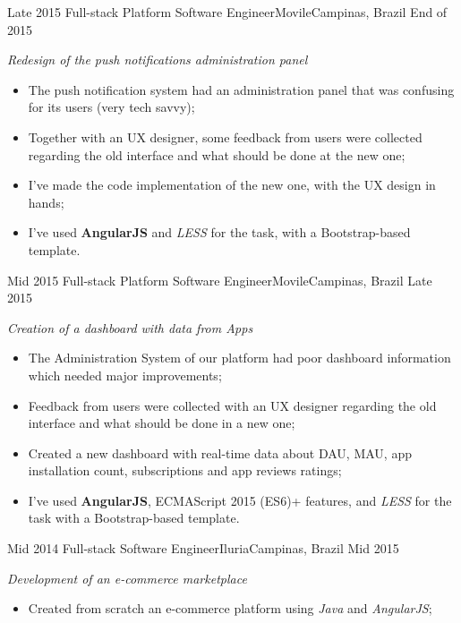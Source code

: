 \begin{experiences}
{\begin{itemize}
          \end{itemize}
        }{}
  \experience
  {Late 2015} {Full-stack Platform Software Engineer}{Movile}{Campinas, Brazil}
  {End of 2015}
        {
        \emph{Redesign of the push notifications administration panel}\\
          \begin{itemize}
            \item The push notification system had an administration panel that was confusing for its users (very tech savvy);
            \item Together with an UX designer, some feedback from users were collected regarding the old interface and what should
            be done at the new one;
            \item I've made the code implementation of the new one, with the UX design in hands;
            \item I've used \textbf{AngularJS} and \emph{LESS} for the task, with a Bootstrap-based template.\\
          \end{itemize}
        }{}
  \experience
  {Mid 2015} {Full-stack Platform Software Engineer}{Movile}{Campinas, Brazil}
  {Late 2015}
        {
        \emph{Creation of a dashboard with data from Apps}\\
          \begin{itemize}
            \item The Administration System of our platform had poor dashboard information which needed major improvements;
            \item Feedback from users were collected with an UX designer regarding the old interface and what should be done in a new one;
            \item Created a new dashboard with real-time data about DAU, MAU, app installation count, subscriptions and app reviews ratings;
            \item I've used \textbf{AngularJS}, ECMAScript 2015 (ES6)+ features, and \emph{LESS} for the task with a Bootstrap-based template.\\
          \end{itemize}
        }{}
  \experience
  {Mid 2014} {Full-stack Software Engineer}{Iluria}{Campinas, Brazil}
  {Mid 2015}
        {
        \emph{Development of an e-commerce marketplace}\\
          \begin{itemize}
            \item Created from scratch an e-commerce platform using \emph{Java} and \emph{AngularJS};

\end{itemize}}
\end{experiences}
